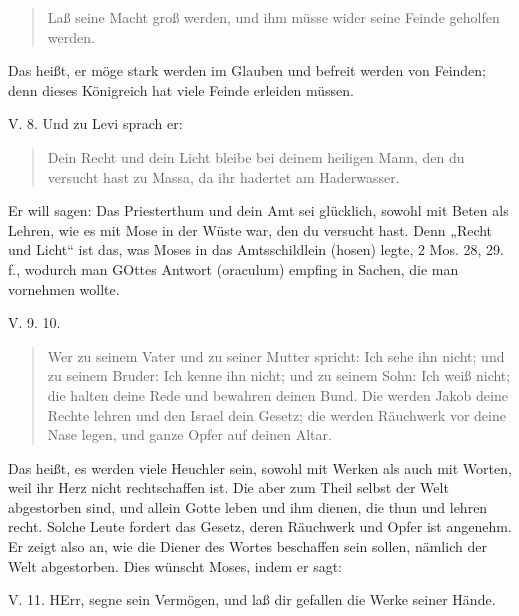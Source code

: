 \begin{quote}
Laß seine Macht groß werden, und ihm müsse wider seine Feinde geholfen werden.
\end{quote}

Das heißt, er möge stark werden im Glauben und befreit werden von Feinden; denn dieses Königreich hat viele Feinde erleiden müssen.

\begin{schriftzitat}
V. 8. Und zu Levi sprach er:
\end{schriftzitat}

\begin{quote}
Dein Recht und dein Licht bleibe bei deinem heiligen Mann, den du versucht hast zu Massa, da ihr hadertet am Haderwasser.
\end{quote}

Er will sagen: Das Priesterthum und dein Amt sei glücklich, sowohl mit Beten als Lehren, wie es mit Mose in der Wüste war, den du versucht hast. Denn „Recht und Licht“ ist das, was Moses in das Amtsschildlein (hosen) legte, 2 Mos. 28, 29. f., wodurch man GOttes Antwort (oraculum) empfing in Sachen, die man vornehmen wollte.

\begin{schriftzitat}
V. 9. 10.
\end{schriftzitat}

\begin{quote}
Wer zu seinem Vater und zu seiner Mutter spricht: Ich sehe ihn nicht; und zu seinem Bruder: Ich kenne ihn nicht; und zu seinem Sohn: Ich weiß nicht; die halten deine Rede und bewahren deinen Bund. Die werden Jakob deine Rechte lehren und den Israel dein Gesetz; die werden Räuchwerk vor deine Nase legen, und ganze Opfer auf deinen Altar.
\end{quote}

Das heißt, es werden viele Heuchler sein, sowohl mit Werken als auch mit Worten, weil ihr Herz nicht rechtschaffen ist. Die aber zum Theil selbst der Welt abgestorben sind, und allein Gotte leben und ihm dienen, die thun und lehren recht. Solche Leute fordert das Gesetz, deren Räuchwerk und Opfer ist angenehm. Er zeigt also an, wie die Diener des Wortes beschaffen sein sollen, nämlich der Welt abgestorben. Dies wünscht Moses, indem er sagt:

\begin{schriftzitat}
V. 11. HErr, segne sein Vermögen, und laß dir gefallen die Werke seiner Hände.
\end{schriftzitat}

